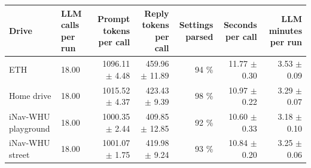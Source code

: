 \begin{tabular}{llrrrrr}
\toprule
Drive & LLM calls per run & Prompt tokens per call & Reply tokens per call & Settings parsed & Seconds per call & LLM minutes per run \\
\midrule
ETH & 18.00 & 1096.11 $\pm$ 4.48 & 459.96 $\pm$ 11.89 & 94 \% & 11.77 $\pm$ 0.30 & 3.53 $\pm$ 0.09 \\
Home drive & 18.00 & 1015.52 $\pm$ 4.37 & 423.43 $\pm$ 9.39 & 98 \% & 10.97 $\pm$ 0.22 & 3.29 $\pm$ 0.07 \\
iNav-WHU playground & 18.00 & 1000.35 $\pm$ 2.44 & 409.85 $\pm$ 12.85 & 92 \% & 10.60 $\pm$ 0.33 & 3.18 $\pm$ 0.10 \\
iNav-WHU street & 18.00 & 1001.07 $\pm$ 1.75 & 419.98 $\pm$ 9.24 & 93 \% & 10.84 $\pm$ 0.20 & 3.25 $\pm$ 0.06 \\
\bottomrule
\end{tabular}
